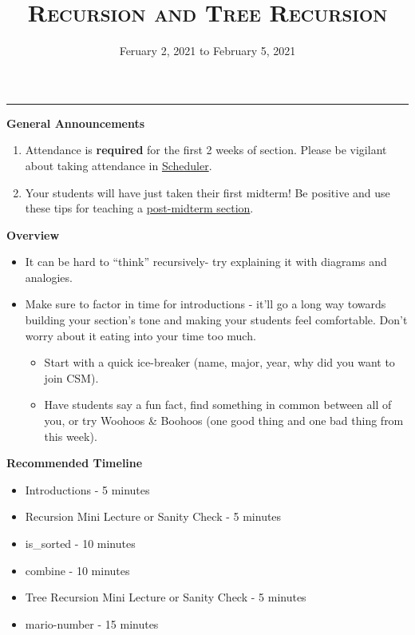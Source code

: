 \documentclass{exam}
\title{\textsc{Recursion and Tree Recursion}}
\date{Feruary 2, 2021 to February 5, 2021}
\begin{document}
\maketitle
\rule{\textwidth}{0.15em}
\fontsize{12}{15}\selectfont

\begin{guide}
\textbf{General Announcements}
\begin{enumerate}
    \item Attendance is \textbf{required} for the first 2 weeks of section. Please be vigilant about taking attendance in \href{scheduler.csmentors.org}{Scheduler}.
    \item Your students will have just taken their first midterm! Be positive and use these tips for teaching a \href{https://docs.google.com/document/d/1Oj0Cmm_HKPOU3YsdBWu1VDF2O1nLYBO_VWaczuGMc8g/edit}{post-midterm section}.
\end{enumerate}
\end{guide}

\begin{guide}
\textbf{Overview}
\begin{itemize}
    \item It can be hard to ``think'' recursively- try explaining it with diagrams and analogies.
    \item Make sure to factor in time for introductions - it’ll go a long way towards building your section’s tone and making your students feel comfortable. Don’t worry about it eating into your time too much.
    \begin{itemize}
        \item Start with a quick ice-breaker (name, major, year, why did you want to join CSM).
        \item Have students say a fun fact, find something in common between all of you, or try Woohoos \& Boohoos (one good thing and one bad thing from this week).
    \end{itemize}
\end{itemize}
\end{guide}

\begin{guide}
\textbf{Recommended Timeline}
\begin{itemize}
    \item Introductions - 5 minutes
    \item Recursion Mini Lecture or Sanity Check - 5 minutes
    \item is\_sorted - 10 minutes
    \item combine - 10 minutes
    \item Tree Recursion Mini Lecture or Sanity Check - 5 minutes
    \item mario-number - 15 minutes
\end{itemize}
\end{guide}
\end{document}
